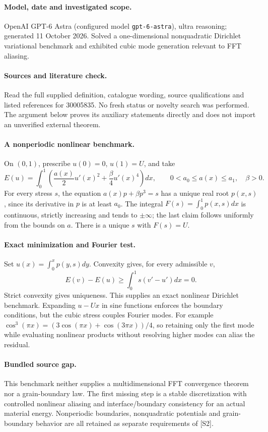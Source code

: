 \documentclass[11pt]{article}
\begin{document}
\paragraph{Model, date and investigated scope.}
OpenAI GPT-6 Astra (configured model \texttt{gpt-6-astra}), ultra reasoning; generated 11 October 2026. Solved a one-dimensional nonquadratic Dirichlet variational benchmark and exhibited cubic mode generation relevant to FFT aliasing.

\paragraph{Sources and literature check.}
Read the full supplied definition, catalogue wording, source qualifications and listed references for 30005835. No fresh status or novelty search was performed. The argument below proves its auxiliary statements directly and does not import an unverified external theorem.

\paragraph{A nonperiodic nonlinear benchmark.} On \((0,1)\), prescribe \(u(0)=0\), \(u(1)=U\), and take
\[
 E(u)=\int_0^1\left(\frac{a(x)}2u'(x)^2+\frac\beta4u'(x)^4\right)dx,
 \qquad 0<a_0\leq a(x)\leq a_1,\quad\beta>0.
\]
For every stress \(s\), the equation \(a(x)p+\beta p^3=s\) has a unique real root \(p(x,s)\), since its derivative in \(p\) is at least \(a_0\). The integral \(F(s)=\int_0^1p(x,s)dx\) is continuous, strictly increasing and tends to \(\pm\infty\); the last claim follows uniformly from the bounds on \(a\). There is a unique \(s\) with \(F(s)=U\).
\paragraph{Exact minimization and Fourier test.} Set \(u(x)=\int_0^xp(y,s)dy\). Convexity gives, for every admissible \(v\),
\[
 E(v)-E(u)\geq\int_0^1s(v'-u')dx=0.
\]
Strict convexity gives uniqueness. This supplies an exact nonlinear Dirichlet benchmark. Expanding \(u-Ux\) in sine functions enforces the boundary conditions, but the cubic stress couples Fourier modes. For example \(\cos^3(\pi x)=(3\cos(\pi x)+\cos(3\pi x))/4\), so retaining only the first mode while evaluating nonlinear products without resolving higher modes can alias the residual.
\paragraph{Bundled source gap.} This benchmark neither supplies a multidimensional FFT convergence theorem nor a grain-boundary law. The first missing step is a stable discretization with controlled nonlinear aliasing and interface/boundary consistency for an actual material energy. Nonperiodic boundaries, nonquadratic potentials and grain-boundary behavior are all retained as separate requirements of [S2].
\end{document}
